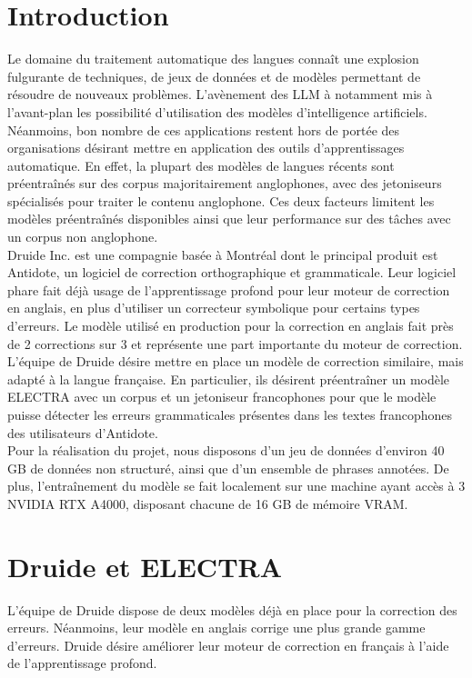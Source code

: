 \documentclass[12pt,twoside,maitrise]{dms}
\theoremstyle{definition}
\numberwithin{equation}{section}
\numberwithin{table}{chapter}
\numberwithin{figure}{chapter}
\begin{document}
\setcounter{page}{17} %
\chapter*{Introduction}
Le domaine du traitement automatique des langues connaît une explosion
fulgurante de techniques, de jeux de données et de modèles permettant de
résoudre de nouveaux problèmes. L'avènement des LLM à notamment mis à
l'avant-plan les possibilité d'utilisation des modèles d'intelligence
artificiels. Néanmoins, bon nombre de ces applications restent hors de portée
des organisations désirant mettre en application des outils d'apprentissages
automatique. En effet, la plupart des modèles de langues récents sont
préentraînés sur des corpus majoritairement anglophones, avec des jetoniseurs
spécialisés pour traiter le contenu anglophone. Ces deux
facteurs limitent les modèles préentraînés disponibles ainsi que leur
performance sur des tâches avec un corpus non anglophone.\\

Druide Inc. est une compagnie basée à Montréal dont le principal produit est
Antidote, un logiciel de correction orthographique et grammaticale. Leur
logiciel phare fait déjà usage de l'apprentissage profond pour leur moteur de
correction en anglais, en plus d'utiliser un correcteur symbolique pour
certains types d'erreurs. Le modèle utilisé en production pour la correction en
anglais fait près de 2 corrections sur 3 et représente une part importante du
moteur de correction. L'équipe de Druide désire mettre en place un modèle de
correction similaire, mais adapté à la langue française. En particulier, ils
désirent préentraîner un modèle ELECTRA avec un corpus et un jetoniseur
francophones pour que le modèle puisse détecter les erreurs grammaticales
présentes dans les textes francophones des utilisateurs d'Antidote.\\

Pour la réalisation du projet, nous disposons d'un jeu de données d'environ 40
GB de données non structuré, ainsi que d'un ensemble de phrases annotées. De
plus, l'entraînement du modèle se fait localement sur une machine ayant accès à
3 NVIDIA RTX A4000, disposant chacune de 16 GB de mémoire VRAM.



\chapter{Druide et ELECTRA}
L'équipe de Druide dispose de deux modèles déjà en place pour la correction des
erreurs. Néanmoins, leur modèle en anglais corrige une plus grande gamme
d'erreurs. Druide désire améliorer leur moteur de correction en français à
l'aide de l'apprentissage profond.
\end{document}
